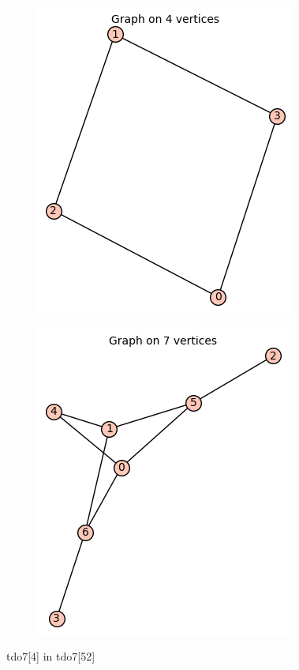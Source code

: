 \documentclass[12pt, a4paper]{article}
\begin{document}
\begin{center}
\begin{figure}[!htb]
\centering
\begin{subfigure}{0.5\textwidth}
  \centering
  \includegraphics[width=0.35\linewidth]{tdo7[4]}
\end{subfigure}%
\begin{subfigure}{0.5\textwidth}
  \centering
  \includegraphics[width=0.4\linewidth]{tdo7[52]}
\end{subfigure}
\caption{tdo7[4] in tdo7[52]}
\label{fig:test}
\end{figure}


\end{center}
\end{document}

